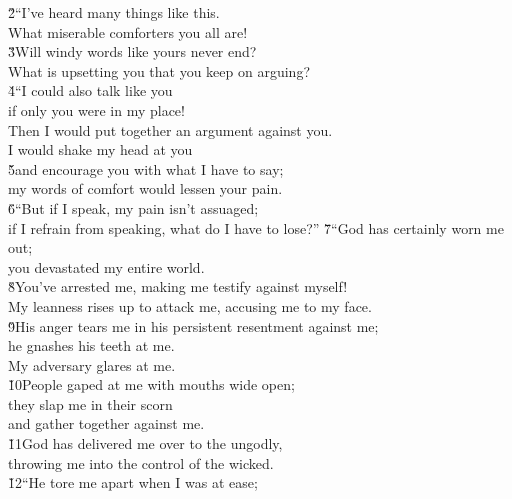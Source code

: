 \begin{poetry}
\poeml \v{2}``I've heard many things like this. \\
\poemll    What miserable comforters you all are! \\
\poeml \v{3}Will windy words like yours never end? \\
\poemll    What is upsetting you that you keep on arguing? \\
\poeml \v{4}``I could also talk like you \\
\poemll    if only you were in my place! \\
\poeml Then I would put together an argument against you. \\
\poemll    I would shake my head at you \\
\poeml \v{5}and encourage you with what I have to say; \\
\poemll    my words of comfort would lessen your pain. \\
\poeml \v{6}``But if I speak, my pain isn't assuaged; \\
\poemll    if I refrain from speaking, what do I have to lose?''
\poeml \v{7}``God has certainly worn me out; \\
\poemll    you devastated my entire world. \\
\poeml \v{8}You've arrested me, making me testify against myself! \\
\poemll    My leanness rises up to attack me, accusing me to my face. \\
\poeml \v{9}His anger tears me in his persistent resentment against me; \\
\poemll    he gnashes his teeth at me. \\
\poemlll       My adversary glares at me. \\
\poeml \v{10}People gaped at me with mouths wide open; \\
\poemll    they slap me in their scorn \\
\poemlll       and gather together against me. \\
\poeml \v{11}God has delivered me over to the ungodly, \\
\poemll    throwing me into the control of the wicked. \\
\poeml \v{12}``He tore me apart when I was at ease; \\

\end{poetry}
